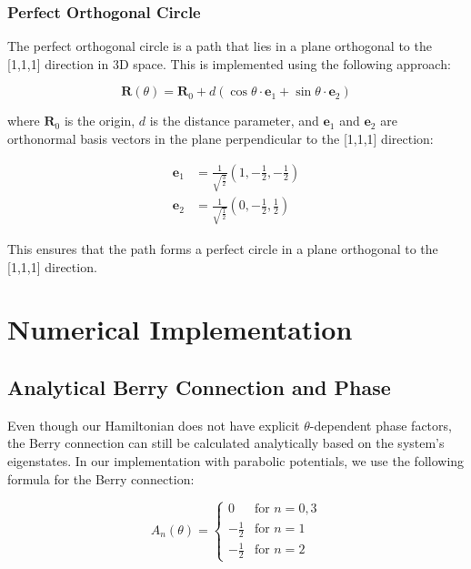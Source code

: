 \documentclass[12pt,a4paper]{article}
\begin{document}
\subsubsection{Perfect Orthogonal Circle}

The perfect orthogonal circle is a path that lies in a plane orthogonal to the [1,1,1] direction in 3D space. This is implemented using the following approach:

\begin{equation}
\bm{R}(\theta) = \bm{R}_0 + d (\cos\theta \cdot \bm{e}_1 + \sin\theta \cdot \bm{e}_2)
\end{equation}

where $\bm{R}_0$ is the origin, $d$ is the distance parameter, and $\bm{e}_1$ and $\bm{e}_2$ are orthonormal basis vectors in the plane perpendicular to the [1,1,1] direction:

\begin{align}
\bm{e}_1 &= \frac{1}{\sqrt{\frac{3}{2}}}(1, -\frac{1}{2}, -\frac{1}{2}) \\
\bm{e}_2 &= \frac{1}{\sqrt{\frac{1}{2}}}(0, -\frac{1}{2}, \frac{1}{2})
\end{align}

This ensures that the path forms a perfect circle in a plane orthogonal to the [1,1,1] direction.

\section{Numerical Implementation}

\subsection{Analytical Berry Connection and Phase}

Even though our Hamiltonian does not have explicit $\theta$-dependent phase factors, the Berry connection can still be calculated analytically based on the system's eigenstates. In our implementation with parabolic potentials, we use the following formula for the Berry connection:

\begin{equation}
A_n(\theta) = \begin{cases}
0 & \text{for } n = 0, 3 \\
-\frac{1}{2} & \text{for } n = 1 \\
-\frac{1}{2} & \text{for } n = 2
\end{cases}
\end{equation}
\end{document}
